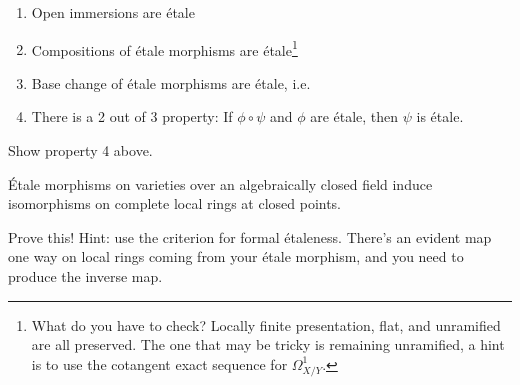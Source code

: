 \begin{proposition}

\envlist

\begin{enumerate}
\def\labelenumi{\arabic{enumi}.}
\tightlist
\item
  Open immersions are étale
\item
  Compositions of étale morphisms are étale\footnote{What do you have to
    check? Locally finite presentation, flat, and unramified are all
    preserved. The one that may be tricky is remaining unramified, a
    hint is to use the cotangent exact sequence for \(\Omega^1_{X/Y}\).}
\item
  Base change of étale morphisms are étale, i.e.~

  \begin{center}
  \end{center}
\item
  There is a 2 out of 3 property: If \(\phi \circ \psi\) and \(\phi\)
  are étale, then \(\psi\) is étale.
\end{enumerate}

\end{proposition}

\begin{exercise}[?]

Show property 4 above.

\end{exercise}

\begin{proposition}[?]

Étale morphisms on varieties over an algebraically closed field induce
isomorphisms on complete local rings at closed points.

\end{proposition}

\begin{exercise}[?]

Prove this! Hint: use the criterion for formal étaleness. There's an
evident map one way on local rings coming from your étale morphism, and
you need to produce the inverse map.

\end{exercise}

